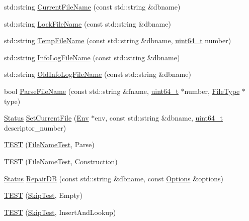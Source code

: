 \begin{DoxyCompactItemize}
\item 
std\+::string \hyperlink{namespaceleveldb_affcb2d434f2a772d7c764cd5d1797a9a}{Current\+File\+Name} (const std\+::string \&dbname)
\item 
std\+::string \hyperlink{namespaceleveldb_a9f772d88ab2d47dec0d68e5eb85c579e}{Lock\+File\+Name} (const std\+::string \&dbname)
\item 
std\+::string \hyperlink{namespaceleveldb_a0563c700d6ff17e88f429464c1442da1}{Temp\+File\+Name} (const std\+::string \&dbname, \hyperlink{stdint_8h_aaa5d1cd013383c889537491c3cfd9aad}{uint64\+\_\+t} number)
\item 
std\+::string \hyperlink{namespaceleveldb_ac40453ca7f9c0bd723873ffe32dc12a2}{Info\+Log\+File\+Name} (const std\+::string \&dbname)
\item 
std\+::string \hyperlink{namespaceleveldb_a2964797a29cbda9d37cce54109eefdc6}{Old\+Info\+Log\+File\+Name} (const std\+::string \&dbname)
\item 
bool \hyperlink{namespaceleveldb_af18fdbbcb483d40c35b4aaa4f00d3f6c}{Parse\+File\+Name} (const std\+::string \&fname, \hyperlink{stdint_8h_aaa5d1cd013383c889537491c3cfd9aad}{uint64\+\_\+t} $\ast$number, \hyperlink{namespaceleveldb_ab8e559ac5cadcb2b5dd531c60df944f1}{File\+Type} $\ast$type)
\item 
\hyperlink{classleveldb_1_1_status}{Status} \hyperlink{namespaceleveldb_a73133aa2e18928553d14913491b094e7}{Set\+Current\+File} (\hyperlink{classleveldb_1_1_env}{Env} $\ast$env, const std\+::string \&dbname, \hyperlink{stdint_8h_aaa5d1cd013383c889537491c3cfd9aad}{uint64\+\_\+t} descriptor\+\_\+number)
\item 
\hyperlink{namespaceleveldb_a28c411f7a30e2e869123a26f6e69e733}{T\+E\+S\+T} (\hyperlink{classleveldb_1_1_file_name_test}{File\+Name\+Test}, Parse)
\item 
\hyperlink{namespaceleveldb_ac77b62bf86349926d23431e4c1c9034a}{T\+E\+S\+T} (\hyperlink{classleveldb_1_1_file_name_test}{File\+Name\+Test}, Construction)
\item 
\hyperlink{classleveldb_1_1_status}{Status} \hyperlink{namespaceleveldb_afb65664fdacb30ab73da9414db5a4208}{Repair\+D\+B} (const std\+::string \&dbname, const \hyperlink{structleveldb_1_1_options}{Options} \&options)
\item 
\hyperlink{namespaceleveldb_a94b31a20798f6d72a6cd11c328fcaba7}{T\+E\+S\+T} (\hyperlink{classleveldb_1_1_skip_test}{Skip\+Test}, Empty)
\item 
\hyperlink{namespaceleveldb_a21e74b2de9a6f3db48c8d3ff277a1e0d}{T\+E\+S\+T} (\hyperlink{classleveldb_1_1_skip_test}{Skip\+Test}, Insert\+And\+Lookup)

\end{DoxyCompactItemize}
